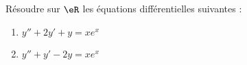 
\begin{exercice}\label{exoautoanalyseCTU-38}

 

Résoudre sur $\eR$ les équations différentielles suivantes :
\begin{enumerate}
\item $y''+2y'+y=xe^{x}$
\item $y''+y'-2y=xe^{x}$
\end{enumerate}







\end{exercice}
